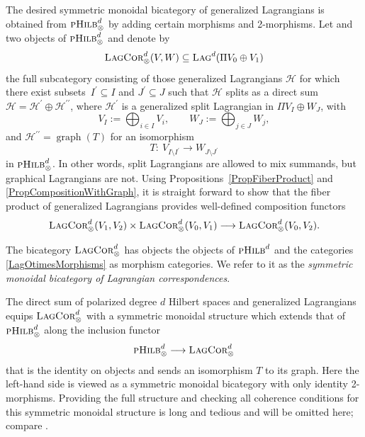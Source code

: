 \documentclass[10pt,a4paper]{amsart}
\numberwithin{equation}{section}
\DeclareMathOperator{\graph}{\mathrm{graph}}
\newcommand{\Lag}{\textsc{Lag}}
\newcommand{\LagCor}{\textsc{LagCor}}
\newcommand{\pHilb}{\textsc{pHilb}}
\begin{document}
The desired symmetric monoidal bicategory of generalized Lagrangians is obtained from $\pHilb^d_\otimes$ by adding certain morphisms and 2-morphisms.
Let  and  two objects of $\pHilb^d_\otimes$ and denote by
\begin{equation}
\label{LagOtimesMorphisms}
\LagCor^d_{\otimes}(V, W) \subseteq \Lag^d(\Pi V_0 \oplus V_1)
\end{equation}
the full subcategory consisting of those generalized Lagrangians $\mathcal{H}$ for which there exist subsets~${I^\prime \subseteq I}$ and $J^\prime \subseteq J$ such that $\mathcal{H}$ splits as a direct sum $\mathcal{H} = \mathcal{H}^\prime \oplus \mathcal{H}^{\prime\prime}$, where $\mathcal{H}^\prime$ is a generalized split Lagrangian in $\Pi V_I \oplus W_J$, with
 \begin{equation*}
 V_I := \bigoplus_{i \in I} V_i, \qquad W_J := \bigoplus_{j \in J} W_j,
 \end{equation*}
 and $\mathcal{H}^{\prime\prime} = \graph(T)$ for an isomorphism
 \[T\colon \ V_{I \setminus I^\prime} \to W_{J \setminus J^\prime}\]
 in $\pHilb^d_\otimes$.
 In other words, split Lagrangians are allowed to mix summands, but graphical Lagrangians are not.
 Using Propositions~\ref{PropFiberProduct} and \ref{PropCompositionWithGraph}, it is straight forward to show that the fiber product of generalized Lagrangians provides well-defined composition functors
 \begin{equation*}
 \LagCor^d_{\otimes}(V_1, V_2) \times\LagCor^d_{\otimes}(V_0, V_1) \longrightarrow \LagCor^d_{\otimes}(V_0, V_2).
 \end{equation*}

\begin{Definition}
 The bicategory $\LagCor^d_{\otimes}$ has objects the objects of $\pHilb^d$ and the categories \eqref{LagOtimesMorphisms} as morphism categories.
 We refer to it as the \emph{symmetric monoidal bicategory of Lagrangian correspondences}.
\end{Definition}

The direct sum of polarized degree $d$ Hilbert spaces and generalized Lagrangians equips $\LagCor^d_\otimes$ with a symmetric monoidal structure which extends that of $\pHilb_\otimes^d$ along the inclusion functor
\begin{equation}
\label{InclusionPHilbTimes}
 \pHilb^d_\otimes \longrightarrow \LagCor^d_\otimes
\end{equation}
that is the identity on objects and sends an isomorphism $T$ to its graph.
Here the left-hand side is viewed as a symmetric monoidal bicategory with only identity 2-morphisms.
Providing the full structure and checking all coherence conditions for this symmetric monoidal structure is long and tedious and will be omitted here; compare \cite{Schommer-Pries}.
\end{document}
